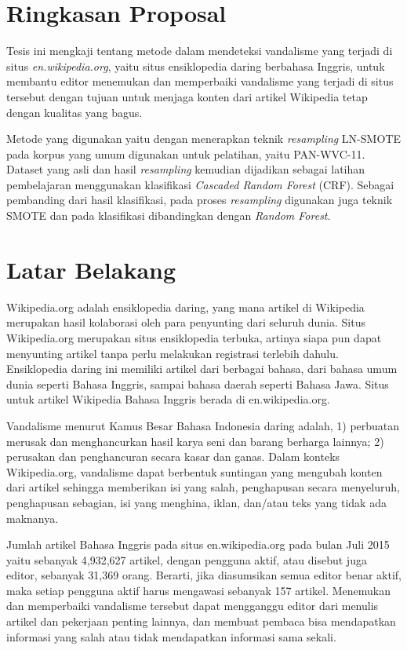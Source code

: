 \section{Ringkasan Proposal}\label{sec:ringkasan}

Tesis ini mengkaji tentang metode dalam mendeteksi vandalisme yang terjadi di situs \textit{en.wikipedia.org}, yaitu situs ensiklopedia daring berbahasa Inggris, untuk membantu editor menemukan dan memperbaiki vandalisme yang terjadi di situs tersebut dengan tujuan untuk menjaga konten dari artikel Wikipedia tetap dengan kualitas yang bagus.

Metode yang digunakan yaitu dengan menerapkan teknik \textit{resampling} LN-SMOTE pada korpus yang umum digunakan untuk pelatihan, yaitu PAN-WVC-11.
Dataset yang asli dan hasil \textit{resampling} kemudian dijadikan sebagai latihan pembelajaran menggunakan klasifikasi \textit{Cascaded Random Forest} (CRF).
Sebagai pembanding dari hasil klasifikasi, pada proses \textit{resampling} digunakan juga teknik SMOTE dan pada klasifikasi dibandingkan dengan \textit{Random Forest}.


\section{Latar Belakang}\label{sec:latar-belakang}

Wikipedia.org adalah ensiklopedia daring, yang mana artikel di Wikipedia merupakan hasil kolaborasi oleh para penyunting dari seluruh dunia.
Situs Wikipedia.org merupakan situs ensiklopedia terbuka, artinya siapa pun dapat menyunting artikel tanpa perlu melakukan registrasi terlebih dahulu.
Ensiklopedia daring ini memiliki artikel dari berbagai bahasa, dari bahasa umum dunia seperti Bahasa Inggris, sampai bahasa daerah seperti Bahasa Jawa.
Situs untuk artikel Wikipedia Bahasa Inggris berada di en.wikipedia.org.

Vandalisme menurut Kamus Besar Bahasa Indonesia daring adalah, 1) perbuatan merusak dan menghancurkan hasil karya seni dan barang berharga lainnya; 2) perusakan dan penghancuran secara kasar dan ganas.
Dalam konteks Wikipedia.org, vandalisme dapat berbentuk suntingan yang mengubah konten dari artikel sehingga memberikan isi yang salah, penghapusan secara menyeluruh, penghapusan sebagian, isi yang menghina, iklan, dan/atau teks yang tidak ada maknanya.

Jumlah artikel Bahasa Inggris pada situs en.wikipedia.org pada bulan Juli 2015 yaitu sebanyak 4,932,627 artikel, dengan pengguna aktif, atau disebut juga editor, sebanyak 31,369 orang.
Berarti, jika diasumsikan semua editor benar aktif, maka setiap pengguna aktif harus mengawasi sebanyak 157 artikel.
Menemukan dan memperbaiki vandalisme tersebut dapat mengganggu editor dari menulis artikel dan pekerjaan penting lainnya, dan membuat pembaca bisa mendapatkan informasi yang salah atau tidak mendapatkan informasi sama sekali.

